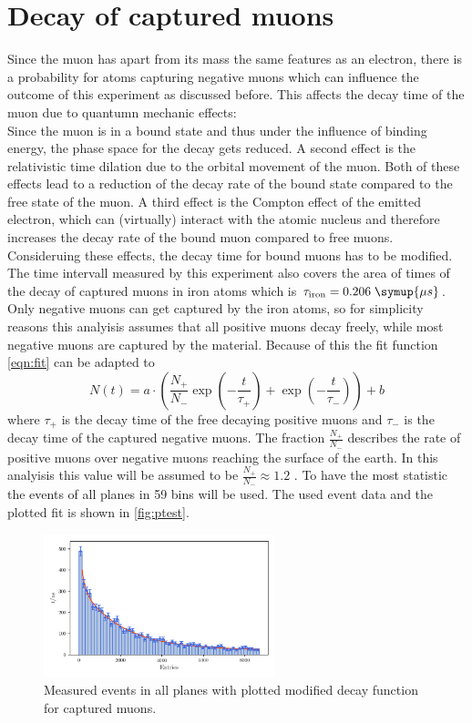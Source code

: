 \section{Decay of captured muons}
\label{sec:muoncapture}
Since the muon has apart from its mass the same features as an electron, there is a probability 
for atoms capturing negative muons which can influence the outcome of this experiment as discussed before.
This
affects the decay time of the muon 
due to quantumn mechanic effects: \\
Since the muon is in a bound state and thus under the influence of binding energy, 
the phase space for the decay gets reduced. A second effect is the relativistic time dilation due to 
the orbital movement of the muon. 
Both of these effects lead to a reduction of the decay rate of the bound state compared 
to the free state of the muon. A third effect is the Compton effect of the emitted electron, which can 
(virtually) interact with the atomic nucleus and therefore increases the decay rate of the bound 
muon compared to free muons. 
Consideruing these effects, the decay time for bound muons has to be modified\cite{bound}.\\
The time intervall measured by this experiment also covers the area of times of the decay of captured muons
in iron atoms which is $\tau_{\text{iron}} = 0.206 \; \symup{\mu s}$.
Only negative muons can get captured by the iron atoms, so for simplicity reasons this analyisis 
assumes that all positive muons decay freely, while most negative muons are captured by the material.
Because of this the fit function \ref{eqn:fit} can be adapted to 
\begin{equation*}
    N(t) = a \cdot \left( \frac{N_{+}}{N_{-}}\exp\left(- \frac{t}{\tau_{+}}\right) + \exp\left(- \frac{t}{\tau_{-}}\right) \right)  + b 
\end{equation*}
where $\tau_{+}$ is the decay time of the free decaying positive muons and $\tau_{-}$ is the decay time 
of the captured negative muons. The fraction $\frac{N_{+}}{N_{-}}$ describes the rate of 
positive muons over negative muons reaching the surface of the earth. In this analyisis this 
value will be assumed to be $\frac{N_{+}}{N_{-}} \approx 1.2$ \cite{lvd}. To have 
the most statistic the events of all planes in 59 bins will be used. The used event data and 
the plotted fit is shown in \autoref{fig:ptest}.
\begin{figure}
    \centering
    \includegraphics[width=0.6\textwidth]{plots/ptest.pdf}
    \caption{Measured events in all planes with plotted modified decay function for captured muons.}
    \label{fig:ptest}
\end{figure}
